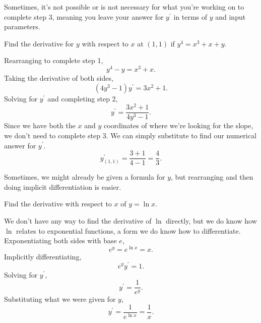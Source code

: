 \noindent
Sometimes, it's not possible or is not necessary for what you're working on to complete step 3, meaning you leave your answer for $y^\prime$ in terms of $y$ and input parameters.
\begin{example}
	Find the derivative for $y$ with respect to $x$ at $(1,1)$ if $y^4 = x^3 + x + y$.
\end{example}
Rearranging to complete step 1,
\begin{equation*}
	y^4 - y = x^3 + x.
\end{equation*}
\indent
Taking the derivative of both sides,
\begin{equation*}
	(4y^3 - 1)y^\prime = 3x^2 + 1.
\end{equation*}
\indent
Solving for $y^\prime$ and completing step 2,
\begin{equation*}
	y^\prime = \frac{3x^2 + 1}{4y^3 - 1}.
\end{equation*}
\indent
Since we have both the $x$ and $y$ coordinates of where we're looking for the slope, we don't need to complete step 3.
We can simply substitute to find our numerical answer for $y^\prime$.
\begin{equation*}
	y^\prime_{(1,1)} = \frac{3 + 1}{4 - 1} = \frac{4}{3}.
\end{equation*}

Sometimes, we might already be given a formula for $y$, but rearranging and then doing implicit differentiation is easier.
\begin{example}
	Find the derivative with respect to $x$ of $y = \ln{x}$.
\end{example}
We don't have any way to find the derivative of $\ln$ directly, but we do know how $\ln$ relates to exponential functions, a form we do know how to differentiate.
Exponentiating both sides with base $e$,
\begin{equation*}
	e^y = e^{\ln{x}} = x.
\end{equation*}
\indent 
Implicitly differentiating,
\begin{equation*}
	e^{y}y^\prime = 1.
\end{equation*}
\indent
Solving for $y^\prime$,
\begin{equation*}
	y^\prime = \frac{1}{e^y}.
\end{equation*}
\indent
Substituting what we were given for $y$,
\begin{equation*}
	y^\prime = \frac{1}{e^{\ln{x}}} = \frac{1}{x}.
\end{equation*}

